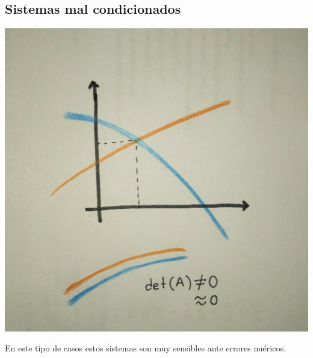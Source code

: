 \subsection*{Sistemas mal condicionados}
\begin{center}
\includegraphics[scale=.05]{imagenes/6.jpg}
\end{center}
En este tipo de casos estos sistemas son muy sensibles ante errores nu\'ericos.
